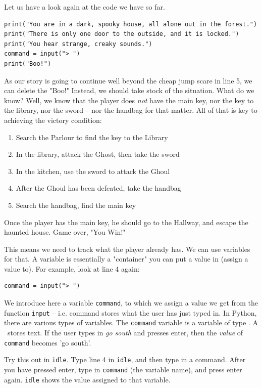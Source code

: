 Let us have a look again at the code we have so far. 

\begin{lstlisting}
print("You are in a dark, spooky house, all alone out in the forest.")
print("There is only one door to the outside, and it is locked.")
print("You hear strange, creaky sounds.")
command = input("> ")
print("Boo!")
\end{lstlisting}

As our story is going to continue well beyond the cheap jump scare in line 5, we can delete the "Boo!" Instead, we should take stock of the situation. What do we know? Well, we know that the player does \emph{not} have the main key, nor the key to the library, nor the sword -- nor the handbag for that matter. All of that is key to achieving the victory condition: 

\begin{enumerate}
\item Search the Parlour to find the key to the Library
\item In the library, attack the Ghost, then take the sword
\item In the kitchen, use the sword to attack the Ghoul
\item After the Ghoul has been defeated, take the handbag
\item Search the handbag, find the main key
\end{enumerate} 

Once the player has the main key, he should go to the Hallway, and escape the haunted house. Game over, "You Win!"

This means we need to track what the player already has. We can use variables for that. A variable is essentially a "container" you can put a value in (assign a value to). For example, look at line 4 again: 

\begin{verbatim}
command = input("> ")
\end{verbatim}      

We introduce here a variable \texttt{command}, to which we assign a value we get from the function \texttt{input} -- i.e. command stores what the user has just typed in. In Python, there are various types of variables. The \texttt{command} variable is a variable of type \textit{\strvar}. A \strvar\ stores text. If the user types in \textit{go south} and presses enter, then the \emph{value} of \texttt{command} becomes 'go south'. 

\begin{Exe} 
Try this out in \texttt{idle}. Type line 4 in \texttt{idle}, and then type in a command. After you have pressed enter, type in \texttt{command} (the variable name), and press enter again. \texttt{idle} shows the value assigned to that variable.  \expend
\end{Exe}

